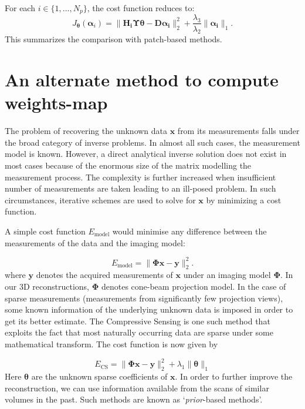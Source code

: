 \documentclass{article}
\begin{document}
For each $i \in \{1,...,N_p\}$, the cost function reduces to:
\begin{equation}
J_{\boldsymbol{\theta}}(\boldsymbol{\alpha}_i) =  \lVert \boldsymbol{H_i \Upsilon \theta}-\boldsymbol{D\alpha_i}\rVert_2^2  + \frac{\lambda_3}{\lambda_2}\lVert\boldsymbol{\alpha_i}\rVert_1.
\label{Eq:alpha_patchBased}
\end{equation}
This summarizes the comparison with patch-based methods.
\section{An alternate method to compute weights-map}
The problem of recovering the unknown data $\boldsymbol{x}$ from its measurements falls under the broad category of inverse problems. In almost all such cases, the measurement model is known. However, a direct analytical inverse solution does not exist in most cases because of the enormous size of the matrix modelling the measurement process. The complexity is further increased when insufficient number of measurements are taken leading to an ill-posed problem. In such circumstances, iterative schemes are used to solve for $\boldsymbol{x}$ by minimizing a cost function. 

A simple cost function $E_\text{model}$ would minimise any difference between the measurements of the data and the imaging model:

\begin{equation}
E_\text{model} = \lVert\boldsymbol{\Phi x- y}\rVert_2^2.
\end{equation}
where $\boldsymbol{y}$ denotes the acquired measurements of $\boldsymbol{x}$ under an imaging model $\boldsymbol{\Phi}$. In our 3D reconstructions, $\boldsymbol{\Phi}$ denotes cone-beam projection model. In the case of sparse measurements (measurements from significantly few projection views), some known information of the underlying unknown data is imposed in order to get its better estimate. The Compressive Sensing is one such method that exploits the fact that most naturally occurring data are sparse under some mathematical transform. The cost function is now given by

\begin{equation}
E_\text{CS} = \lVert\boldsymbol{\Phi x- y}\rVert_2^2  + \lambda_1\lVert\boldsymbol{\theta}\rVert_1
\end{equation}
Here $\boldsymbol{\theta}$ are the unknown sparse coefficients of $\boldsymbol{x}$. In order to further improve the reconstruction, we can use information available from the scans of similar volumes in the past. Such methods are known as `\emph{prior}-based methods'. 
\end{document}

